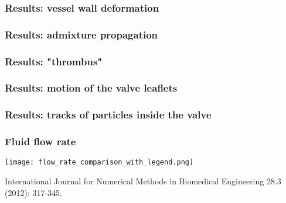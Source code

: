 \documentclass[14pt]{beamer}
\begin{document}

\begin{frame}
\frametitle{Results: vessel wall deformation}
\end{frame}

\begin{frame}
\frametitle{Results: admixture propagation}
\end{frame}

\begin{frame}
\frametitle{Results: "thrombus"}
\end{frame}

\begin{frame}
\frametitle{Results: motion of the valve leaflets}
\end{frame}

\begin{frame}
\frametitle{Results: tracks of particles inside the valve}
\end{frame}




\begin{frame}
\frametitle{Fluid flow rate}
    \begin{center}
        \texttt{[image: flow\_rate\_comparison\_with\_legend.png]}
    \end{center}

    \begin{adjustbox}{max totalsize={1.0\textwidth}{.7\textheight},center}
        {\scriptsize
            International Journal for Numerical Methods in Biomedical Engineering 28.3 (2012): 317-345.
        }
    \end{adjustbox}
\end{frame}
\end{document}
